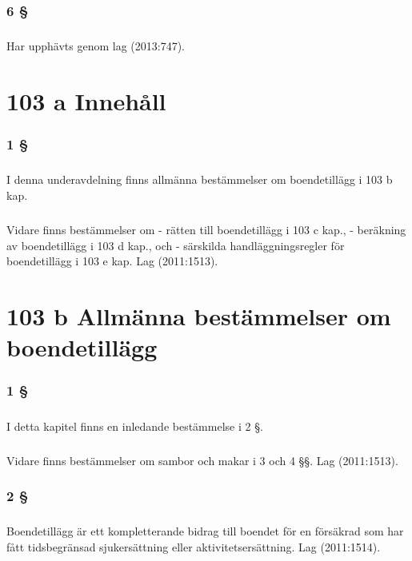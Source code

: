 \documentclass[a4paper,notitlepage,openany,10pt]{book}
\begin{document}
\subsection*{6 §}
\paragraph*{}
Har upphävts genom
lag (2013:747).
\chapter*{103 a Innehåll}
\subsection*{1 §}
\paragraph*{}
I denna underavdelning finns allmänna bestämmelser om boendetillägg i 103 b kap.
\paragraph*{}
Vidare finns bestämmelser om
\newline - rätten till boendetillägg i 103 c kap.,
\newline - beräkning av boendetillägg i 103 d kap., och
\newline - särskilda handläggningsregler för boendetillägg i 103 e kap.
Lag (2011:1513).
\chapter*{103 b Allmänna bestämmelser om boendetillägg}
\subsection*{1 §}
\paragraph*{}
I detta kapitel finns en inledande bestämmelse i 2 §.
\paragraph*{}
Vidare finns bestämmelser om sambor och makar i 3 och 4 §§.
Lag (2011:1513).
\subsection*{2 §}
\paragraph*{}
Boendetillägg är ett kompletterande bidrag till boendet för en försäkrad som har fått tidsbegränsad sjukersättning eller aktivitetsersättning.
Lag (2011:1514).
\end{document}
